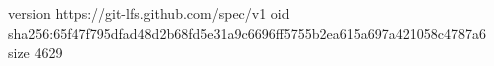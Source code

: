 version https://git-lfs.github.com/spec/v1
oid sha256:65f47f795dfad48d2b68fd5e31a9c6696ff5755b2ea615a697a421058c4787a6
size 4629
